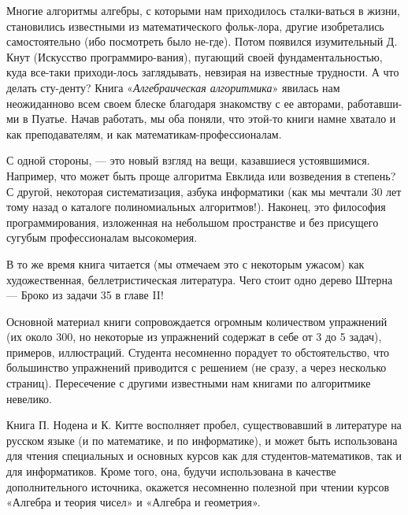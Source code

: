 {{{   Многие алгоритмы алгебры, с которыми нам приходилось сталки-\linebreak ваться в жизни, становились известными из математического фольк-\linebreak лора, другие изобретались самостоятельно (ибо посмотреть было не-\linebreak где). Потом появился изумительный Д. Кнут (Искусство программиро-\linebreak вания), пугающий своей фундаментальностью, куда все-таки приходи-\linebreak лось заглядывать, невзирая на известные трудности. А что делать сту-\linebreak денту? Книга «\textit {Алгебраическая алгоритмика}» явилась нам неожиданно\linebreak во всем своем блеске благодаря знакомству с ее авторами, работавши-\linebreak ми в Пуатье. Начав работать, мы оба поняли, что этой-то книги нам\linebreak не хватало и как преподавателям, и как математикам-профессионалам.}
   
\newpage 
\restoretop
{}
\setcounter{page}{6}%
\noindent
С одной стороны, — это новый взгляд на вещи, казавшиеся устоявшимися. Например, что может быть проще алгоритма Евклида или возведения в степень? С другой, некоторая систематизация, азбука информатики (как мы мечтали 30 лет тому назад о каталоге полиномиальных алгоритмов!). Наконец, это философия программирования, изложенная на небольшом пространстве и без присущего сугубым профессионалам высокомерия.

В то же время книга читается (мы отмечаем это с некоторым ужасом) как художественная, беллетристическая литература. Чего стоит одно дерево Штерна — Броко из задачи 35 в главе II!

   Основной материал книги сопровождается огромным количеством упражнений (их около 300, но некоторые из упражнений содержат в себе от 3 до 5 задач), примеров, иллюстраций. Студента несомненно порадует то обстоятельство, что большинство упражнений приводится с решением (не сразу, а через несколько страниц). Пересечение с другими известными нам книгами по алгоритмике невелико.
   
Книга П. Нодена и К. Китте восполняет пробел, существовавший в литературе на русском языке (и по математике, и по информатике), и может быть использована для чтения специальных и основных курсов как для студентов-математиков, так и для информатиков. Кроме того, она, будучи использована в качестве дополнительного источника, окажется несомненно полезной при чтении курсов «Алгебра и теория чисел» и «Алгебра и геометрия».

}}
